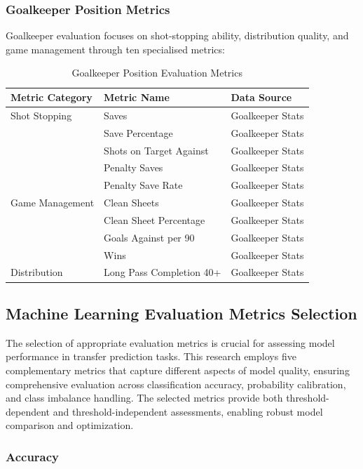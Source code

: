 \subsubsection{Goalkeeper Position Metrics}

Goalkeeper evaluation focuses on shot-stopping ability, distribution quality, and game management through ten specialised metrics:

\begin{table}[H]
\centering
\caption{Goalkeeper Position Evaluation Metrics}
\label{tab:goalkeeper_metrics}
\begin{tabular}{lll}
\toprule
\textbf{Metric Category} & \textbf{Metric Name} & \textbf{Data Source} \\
\midrule
Shot Stopping & Saves & Goalkeeper Stats \\
 & Save Percentage & Goalkeeper Stats \\
 & Shots on Target Against & Goalkeeper Stats \\
 & Penalty Saves & Goalkeeper Stats \\
 & Penalty Save Rate & Goalkeeper Stats \\
Game Management & Clean Sheets & Goalkeeper Stats \\
 & Clean Sheet Percentage & Goalkeeper Stats \\
 & Goals Against per 90 & Goalkeeper Stats \\
 & Wins & Goalkeeper Stats \\
Distribution & Long Pass Completion 40+ & Goalkeeper Stats \\
\bottomrule
\end{tabular}
\end{table}

\subsection{Machine Learning Evaluation Metrics Selection}

The selection of appropriate evaluation metrics is crucial for assessing model performance in transfer prediction tasks. This research employs five complementary metrics that capture different aspects of model quality, ensuring comprehensive evaluation across classification accuracy, probability calibration, and class imbalance handling. The selected metrics provide both threshold-dependent and threshold-independent assessments, enabling robust model comparison and optimization.

\subsubsection{Accuracy}

